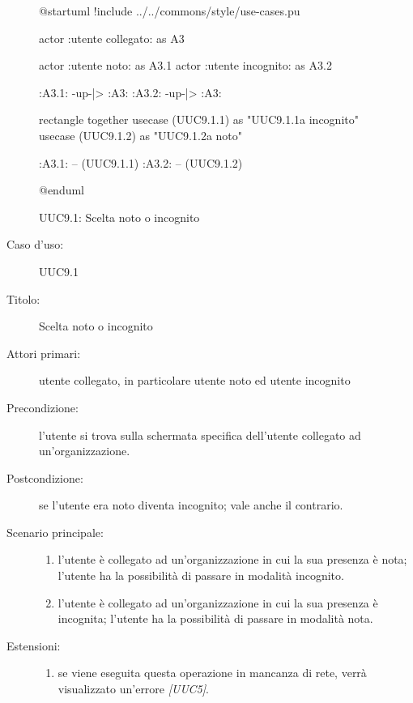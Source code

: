 \documentclass[../../../analisi-dei-requisiti.tex]{subfiles}
\begin{document}
\begin{figure}[H]
  \centering
  \begin{plantuml}
  @startuml
  !include ../../commons/style/use-cases.pu

  actor :utente collegato: as A3

  actor :utente noto: as A3.1
  actor :utente incognito: as A3.2

  :A3.1: -up-|> :A3:
  :A3.2: -up-|> :A3:

  rectangle {
    together {
      usecase (UUC9.1.1) as "UUC9.1.1\nPassaggio a incognito"
      usecase (UUC9.1.2) as "UUC9.1.2\nPassaggio a noto"
    }
  }

  :A3.1: -- (UUC9.1.1)
  :A3.2: -- (UUC9.1.2)

  @enduml
  \end{plantuml}
  \caption{UUC9.1: Scelta noto o incognito}
  \label{fig:uuc9_1}
\end{figure}

\begin{description}
  \item[Caso d’uso:] UUC9.1
  \item[Titolo:] Scelta noto o incognito
  \item[Attori primari:] utente collegato, in particolare utente noto ed utente incognito
  \item[Precondizione:] l'utente si trova sulla schermata specifica dell'utente collegato ad un'organizzazione.
  \item[Postcondizione:] se l'utente era noto diventa incognito; vale anche il contrario.
  \item[Scenario principale:]
        \begin{enumerate}
          \item l'utente è collegato ad un'organizzazione in cui la sua presenza è nota; l'utente ha la possibilità di passare in modalità incognito.
          \item l'utente è collegato ad un'organizzazione in cui la sua presenza è incognita; l'utente ha la possibilità di passare in modalità nota.
        \end{enumerate}
  \item[Estensioni:]
        \begin{enumerate}
          \item se viene eseguita questa operazione in mancanza di rete, verrà visualizzato un'errore \emph{[UUC5]}.
        \end{enumerate}
\end{description}
\end{document}

